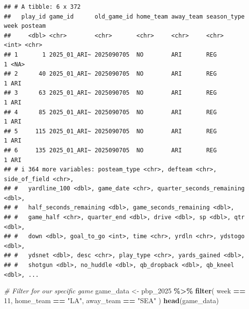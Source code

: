 \documentclass[
]{article}
\newenvironment{Shaded}{\begin{snugshade}}{\end{snugshade}}
\newcommand{\CommentTok}[1]{\textcolor[rgb]{0.56,0.35,0.01}{\textit{#1}}}
\newcommand{\DecValTok}[1]{\textcolor[rgb]{0.00,0.00,0.81}{#1}}
\newcommand{\FunctionTok}[1]{\textcolor[rgb]{0.13,0.29,0.53}{\textbf{#1}}}
\newcommand{\NormalTok}[1]{#1}
\newcommand{\OtherTok}[1]{\textcolor[rgb]{0.56,0.35,0.01}{#1}}
\newcommand{\SpecialCharTok}[1]{\textcolor[rgb]{0.81,0.36,0.00}{\textbf{#1}}}
\newcommand{\StringTok}[1]{\textcolor[rgb]{0.31,0.60,0.02}{#1}}
\begin{document}
\begin{verbatim}
## # A tibble: 6 x 372
##   play_id game_id      old_game_id home_team away_team season_type  week posteam
##     <dbl> <chr>        <chr>       <chr>     <chr>     <chr>       <int> <chr>  
## 1       1 2025_01_ARI~ 2025090705  NO        ARI       REG             1 <NA>   
## 2      40 2025_01_ARI~ 2025090705  NO        ARI       REG             1 ARI    
## 3      63 2025_01_ARI~ 2025090705  NO        ARI       REG             1 ARI    
## 4      85 2025_01_ARI~ 2025090705  NO        ARI       REG             1 ARI    
## 5     115 2025_01_ARI~ 2025090705  NO        ARI       REG             1 ARI    
## 6     135 2025_01_ARI~ 2025090705  NO        ARI       REG             1 ARI    
## # i 364 more variables: posteam_type <chr>, defteam <chr>, side_of_field <chr>,
## #   yardline_100 <dbl>, game_date <chr>, quarter_seconds_remaining <dbl>,
## #   half_seconds_remaining <dbl>, game_seconds_remaining <dbl>,
## #   game_half <chr>, quarter_end <dbl>, drive <dbl>, sp <dbl>, qtr <dbl>,
## #   down <dbl>, goal_to_go <int>, time <chr>, yrdln <chr>, ydstogo <dbl>,
## #   ydsnet <dbl>, desc <chr>, play_type <chr>, yards_gained <dbl>,
## #   shotgun <dbl>, no_huddle <dbl>, qb_dropback <dbl>, qb_kneel <dbl>, ...
\end{verbatim}

\begin{Shaded}
\begin{Highlighting}[]
\CommentTok{\# Filter for our specific game}
\NormalTok{game\_data }\OtherTok{\textless{}{-}}\NormalTok{ pbp\_2025 }\SpecialCharTok{\%\textgreater{}\%}
  \FunctionTok{filter}\NormalTok{(}
\NormalTok{    week }\SpecialCharTok{==} \DecValTok{11}\NormalTok{,}
\NormalTok{    home\_team }\SpecialCharTok{==} \StringTok{"LA"}\NormalTok{,}
\NormalTok{    away\_team }\SpecialCharTok{==} \StringTok{"SEA"}
\NormalTok{  )}
\FunctionTok{head}\NormalTok{(game\_data)}
\end{Highlighting}
\end{Shaded}
\end{document}
